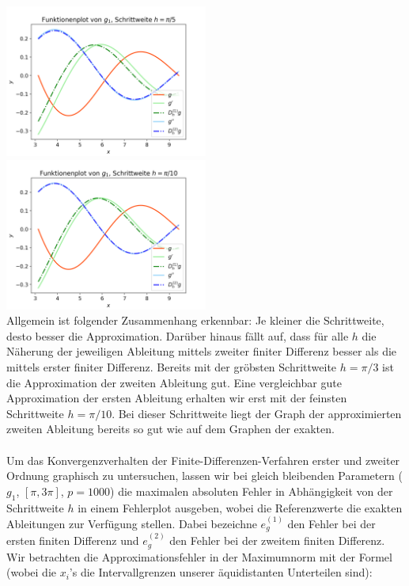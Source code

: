 \documentclass{scrartcl}
\begin{document}
\includegraphics[width=0.5\textwidth]{Grafiken/Funktionenplot_Pi_Funftel} \includegraphics[width=0.5\textwidth]{Grafiken/Funktionenplot_Pi_Zehntel}\\
\vspace{-0.5cm}
\vspace{0.5cm}
Allgemein ist folgender Zusammenhang erkennbar: Je kleiner die Schrittweite, desto besser die Approximation.
Darüber hinaus fällt auf, dass für alle $h$ die Näherung der jeweiligen Ableitung mittels zweiter finiter Differenz besser als die mittels erster finiter Differenz.
Bereits mit der gröbsten Schrittweite $h = \pi/3$ ist die Approximation der zweiten Ableitung gut.
Eine vergleichbar gute Approximation der ersten Ableitung erhalten wir erst mit der feinsten Schrittweite $h = \pi/10$.
Bei dieser Schrittweite liegt der Graph der approximierten zweiten Ableitung bereits so gut wie auf dem Graphen der exakten. \\
 \\
Um das Konvergenzverhalten der Finite-Differenzen-Verfahren erster und zweiter Ordnung graphisch zu untersuchen, lassen wir bei gleich bleibenden Parametern ($g_1$, $[\pi, 3\pi]$, $p = 1000$) die maximalen absoluten Fehler in Abhängigkeit von der Schrittweite $h$ in einem Fehlerplot ausgeben, wobei die Referenzwerte die exakten Ableitungen zur Verfügung stellen. Dabei bezeichne $e_g^{(1)}$ den Fehler bei der ersten finiten Differenz und $e_g^{(2)}$ den Fehler bei der zweitem finiten Differenz. Wir betrachten die Approximationsfehler in der Maximumnorm mit der Formel (wobei die $x_i$'s die Intervallgrenzen unserer äquidistanten Unterteilen sind):
\end{document}
